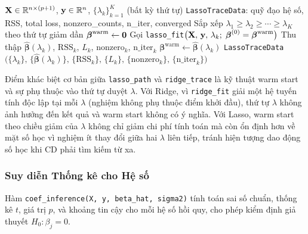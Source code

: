 \begin{algorithm}[H]
\caption{Regularization Path for Lasso (\texttt{lasso\_path})}
\label{alg:lasso_path}
\begin{algorithmic}[1]
\Require $\mathbf{X} \in \mathbb{R}^{n\times(p+1)}$, $\mathbf{y} \in \mathbb{R}^n$, $\{\lambda_k\}_{k=1}^K$
         (bất kỳ thứ tự)
\Ensure \texttt{LassoTraceData}: quỹ đạo hệ số, RSS, total loss, nonzero\_counts, n\_iter, converged
\State Sắp xếp $\lambda_1 \geq \lambda_2 \geq \cdots \geq \lambda_K$ theo thứ tự giảm dần
\State $\boldsymbol{\beta}^{\text{warm}} \gets \mathbf{0}$
    \State Gọi \texttt{lasso\_fit}$\bigl(\mathbf{X},\,\mathbf{y},\,\lambda_k;\;\boldsymbol{\beta}^{(0)} = \boldsymbol{\beta}^{\text{warm}}\bigr)$
    \State Thu thập $\hat{\boldsymbol{\beta}}(\lambda_k)$, $\text{RSS}_k$, $L_k$, $\text{nonzero}_k$, $\text{n\_iter}_k$
        \State $\boldsymbol{\beta}^{\text{warm}} \gets \hat{\boldsymbol{\beta}}(\lambda_k)$
    \EndIf
\EndFor
\State \Return \texttt{LassoTraceData}$\bigl(\{\lambda_k\},\,\{\hat{\boldsymbol{\beta}}(\lambda_k)\},\,\{\text{RSS}_k\},\,\{L_k\},\,\{\text{nonzero}_k\},\,\{\text{n\_iter}_k\}\bigr)$
\end{algorithmic}
\end{algorithm}

\begin{note}
Điểm khác biệt cơ bản giữa \texttt{lasso\_path} và \texttt{ridge\_trace} là kỹ thuật warm
start và sự phụ thuộc vào thứ tự duyệt $\lambda$. Với Ridge, vì \texttt{ridge\_fit} giải
một hệ tuyến tính độc lập tại mỗi $\lambda$ (nghiệm không phụ thuộc điểm khởi đầu),
thứ tự $\lambda$ không ảnh hưởng đến kết quả và warm start không có ý nghĩa. Với Lasso,
warm start theo chiều giảm của $\lambda$ không chỉ giảm chi phí tính toán mà còn ổn định
hơn về mặt số học vì nghiệm ít thay đổi giữa hai $\lambda$ liên tiếp, tránh hiện tượng
dao động số học khi CD phải tìm kiếm từ xa.
\end{note}

\subsubsection{Suy diễn Thống kê cho Hệ số}

Hàm \texttt{coef\_inference(X, y, beta\_hat, sigma2)} tính toán sai số chuẩn, thống kê $t$, giá trị $p$, và khoảng tin cậy cho mỗi hệ số hồi quy, cho phép kiểm định giả thuyết $H_0 : \beta_j = 0$.


